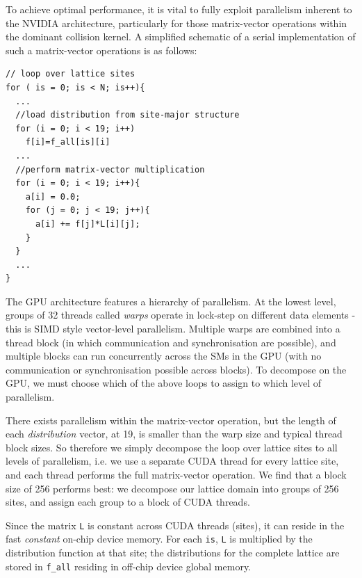 To achieve optimal performance, it is vital to fully exploit
parallelism inherent to the NVIDIA architecture, particularly for
those matrix-vector operations within the dominant collision kernel. A
simplified schematic of a serial implementation of such a matrix-vector
operations is as follows:
{\footnotesize
\begin{verbatim}
// loop over lattice sites
for ( is = 0; is < N; is++){
  ...
  //load distribution from site-major structure
  for (i = 0; i < 19; i++)    
    f[i]=f_all[is][i]
  ...
  //perform matrix-vector multiplication  
  for (i = 0; i < 19; i++){    
    a[i] = 0.0;    
    for (j = 0; j < 19; j++){      
      a[i] += f[j]*L[i][j];   
    }
  }
  ...
}
\end{verbatim}
}
The GPU architecture features a hierarchy of parallelism. At the
lowest level, groups of 32 threads called {\it warps} operate in
lock-step on different data elements - this is SIMD style vector-level
parallelism. Multiple warps are combined into a thread block (in which
communication and synchronisation are possible), and multiple blocks can
run concurrently across the SMs in the GPU (with no communication or
synchronisation possible across blocks).  To decompose on the GPU, we
must choose which of the above loops to assign to which level of
parallelism.

There exists parallelism within the matrix-vector operation, but the
length of each {\it distribution} vector, at 19, is smaller than the
warp size and typical thread block sizes. So therefore we simply
decompose the loop over lattice sites to all levels of parallelism,
i.e.  we use a separate CUDA thread for every lattice site, and each
thread performs the full matrix-vector operation. We find that a block
size of 256 performs best: we decompose our lattice domain into groups
of 256 sites, and assign each group to a block of CUDA threads.

Since the matrix \verb+L+ is constant across CUDA threads (sites), it
can reside in the fast {\it constant} on-chip device memory. For each
\verb+is+, \verb+L+ is multiplied by the distribution function at that
site; the distributions for the complete lattice are stored in
\verb+f_all+ residing in off-chip device global memory.


